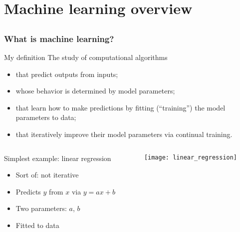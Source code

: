 \section[ML overview]{Machine learning overview}

\subsection{}

\begin{frame}
    \frametitle{What is machine learning?}

    \begin{block}{My definition}
        The study of computational algorithms
        \begin{itemize}
            \item that \alert{predict} outputs from inputs;
            \item whose behavior is determined by \alert{model parameters};
            \item that \alert{learn} how to make predictions by fitting (``training'') the model parameters to data;
            \item that \alert{iteratively} improve their model parameters via continual training.
        \end{itemize}
    \end{block}
    \pause

    \begin{columns}
        \begin{column}{2.5in}
            Simplest example: linear regression
            \begin{itemize}
                \item Sort of: not iterative
                \item Predicts $y$ from $x$ via $y = ax + b$
                \item Two parameters: $a$, $b$
                \item Fitted to data
            \end{itemize}
        \end{column}
        \begin{column}{1.75in}
            \texttt{[image: linear\_regression]}
        \end{column}
    \end{columns}
\end{frame}

